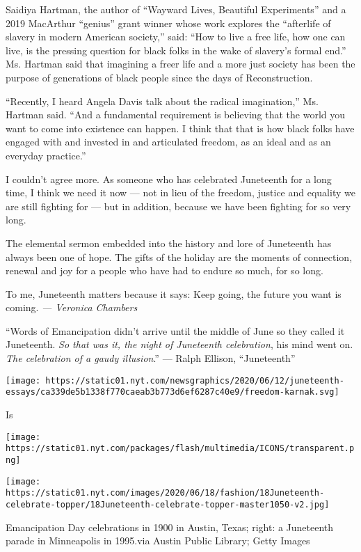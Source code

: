 Saidiya Hartman, the author of ``Wayward Lives, Beautiful Experiments''
and a 2019 MacArthur ``genius'' grant winner whose work explores the
``afterlife of slavery in modern American society,'' said: ``How to live
a free life, how one can live, is the pressing question for black folks
in the wake of slavery's formal end.'' Ms. Hartman said that imagining a
freer life and a more just society has been the purpose of generations
of black people since the days of Reconstruction.

``Recently, I heard Angela Davis talk about the radical imagination,''
Ms. Hartman said. ``And a fundamental requirement is believing that the
world you want to come into existence can happen. I think that that is
how black folks have engaged with and invested in and articulated
freedom, as an ideal and as an everyday practice.''

I couldn't agree more. As someone who has celebrated Juneteenth for a
long time, I think we need it now --- not in lieu of the freedom,
justice and equality we are still fighting for --- but in addition,
because we have been fighting for so very long.

The elemental sermon embedded into the history and lore of Juneteenth
has always been one of hope. The gifts of the holiday are the moments of
connection, renewal and joy for a people who have had to endure so much,
for so long.

To me, Juneteenth matters because it says: Keep going, the future you
want is coming. \emph{--- Veronica Chambers}

``Words of Emancipation didn't arrive until the middle of June so they
called it Juneteenth. \emph{So that was it, the night of Juneteenth
celebration}, his mind went on. \emph{The celebration of a gaudy
illusion}.'' --- Ralph Ellison, ``Juneteenth''

\href{https://www.nytimes.com/article/juneteenth-celebration-history.html}{}

\texttt{[image: https://static01.nyt.com/newsgraphics/2020/06/12/juneteenth-essays/ca339de5b1338f770caeab3b773d6ef6287c40e9/freedom-karnak.svg]}

Is

\texttt{[image: https://static01.nyt.com/packages/flash/multimedia/ICONS/transparent.png]}

\texttt{[image: https://static01.nyt.com/images/2020/06/18/fashion/18Juneteenth-celebrate-topper/18Juneteenth-celebrate-topper-master1050-v2.jpg]}

Emancipation Day celebrations in 1900 in Austin, Texas; right: a
Juneteenth parade in Minneapolis in 1995.via Austin Public Library;
Getty Images

